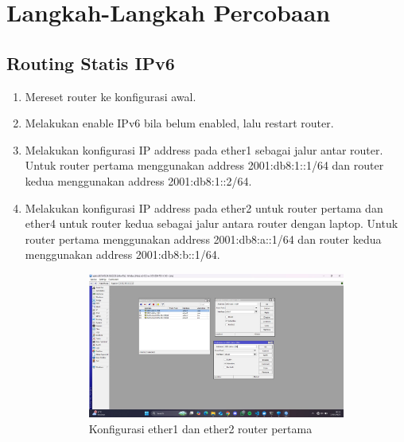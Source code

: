 \section{Langkah-Langkah Percobaan}
\subsection{Routing Statis IPv6}
\begin{enumerate}
	\item Mereset router ke konfigurasi awal.
	\item Melakukan enable IPv6 bila belum enabled, lalu restart router.
	\item Melakukan konfigurasi IP address pada ether1 sebagai jalur antar router. Untuk router pertama menggunakan address 2001:db8:1::1/64 dan router kedua menggunakan address 2001:db8:1::2/64.
	\item Melakukan konfigurasi IP address pada ether2 untuk router pertama dan ether4 untuk router kedua sebagai jalur antara router dengan laptop. Untuk router pertama menggunakan address 2001:db8:a::1/64 dan router kedua menggunakan address 2001:db8:b::1/64.
	\begin{figure}[H]
		\centering
		\begin{subfigure}[b]{0.4\linewidth}
			\centering
			\includegraphics[width=\linewidth]{P2/img/router 1 laptop 1 (4).jpg}
			\caption{Konfigurasi ether1 dan ether2 router pertama\label{fig:konfigurasiR1}}
		\end{subfigure}
		\begin{subfigure}[b]{0.4\linewidth}
			\centering

\end{subfigure}
\end{figure}
\end{enumerate}
